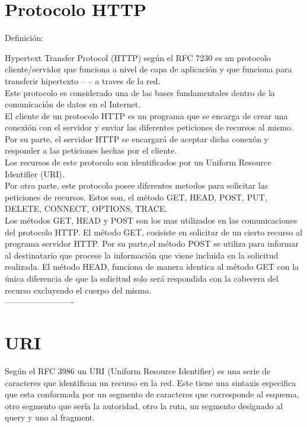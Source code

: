 \documentclass{article}
\begin{document}
\section{Protocolo HTTP}

Definici\'on:

Hypertext Transfer Protocol (HTTP) seg\'un el RFC 7230 es un protocolo cliente/servidor que funciona a nivel de capa de aplicaci\'on y que funciona para transferir hipertexto -- -- a traves de la red.\\

 Este protocolo es considerado una de las bases fundamentales dentro de la comunicaci\'on de datos en el Internet.\\
 
 El cliente de un protocolo HTTP es un programa que se encarga de crear una conexi\'on con el servidor y enviar las diferentes peticiones de recursos al mismo. Por su parte, el servidor HTTP se encargar\'a de aceptar dicha conex\'on y responder a las peticiones hechas por el cliente.\\
 
Los recursos de este protocolo son identificados por un Uniform Resource Identifier (URI).\\

Por otra parte, este protocolo posee diferentes metodos para solicitar las peticiones de recursos. Estos son, el m\'etodo GET, HEAD, POST, PUT, DELETE, CONNECT, OPTIONS, TRACE. \\

Los m\'etodos GET, HEAD y POST son los mas utilizados en las comunicaciones del protocolo HTTP. El m\'etodo GET, cosisiste en solicitar de un cierto recurso al programa servidor HTTP. Por su parte,el m\'etodo POST se utiliza para informar al destinatario que procese la informaci\'on que viene incluida en la solicitud realizada. El m\'etodo HEAD, funciona de manera identica al m\'etodo GET con la \'unica diferencia de que la solicitud solo ser\'a respondida con la cabecera del recurso excluyendo el cuerpo del mismo.\\

-------------------------\\
    
\section{URI}

Seg\'un el RFC 3986 un URI (Uniform Resource Identifier) es una serie de caracteres que identifican un recurso en la red. Este tiene una sintaxis especifica que esta conformada por un segmento de caracteres que corresponde al esquema, otro segmento que ser\'ia la autoridad, otro la ruta, un segmento designado al query y uno al fragment.\\
\end{document}
